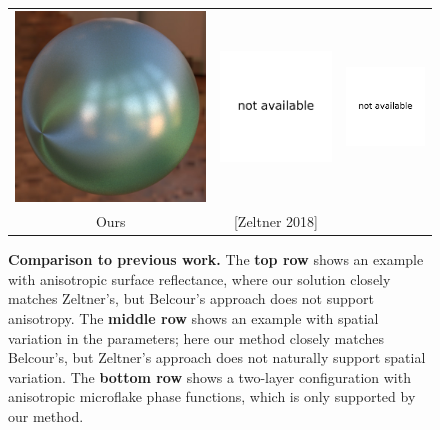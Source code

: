 \begin{figure}[t]
\begin{tabular}{ccc}
	    \includegraphics[width=0.315\columnwidth]{images/validations/compare2/sphere_1024spp_60min.jpg} &
	    \includegraphics[width=0.315\columnwidth]{images/validations/compare2/na.pdf} &
	    \includegraphics[width=0.315\columnwidth]{images/validations/compare2/na.pdf} \\

	    Ours &
	    [Zeltner 2018] &
	    \cite{Belcour2018}
	\end{tabular}
    \caption{\label{fig:compare-previous}
    	\textbf{Comparison to previous work.} The \textbf{top row} shows an example with anisotropic surface reflectance, where our solution closely matches Zeltner's, but Belcour's approach does not support anisotropy. The \textbf{middle row} shows an example with spatial variation in the parameters; here our method closely matches Belcour's, but Zeltner's approach does not naturally support spatial variation. The \textbf{bottom row} shows a two-layer configuration with anisotropic microflake phase functions, which is only supported by our method.
    }
\end{figure}


